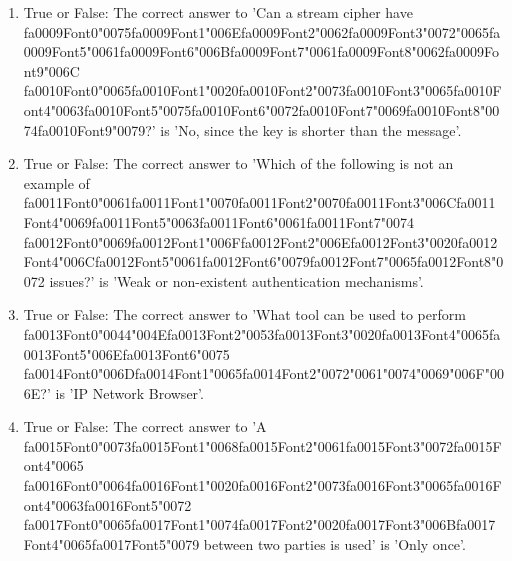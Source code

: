 \documentclass[12pt]{article}
\begin{document}
\begin{enumerate}[label=\arabic*.]
\item True or False: The correct answer to 'Can a stream cipher have {\csname fa0009Font0\endcsname\char"0075}{\csname fa0009Font1\endcsname\char"006E}{\csname fa0009Font2\endcsname\char"0062}{\csname fa0009Font3\endcsname\char"0072}{\char"0065}{\csname fa0009Font5\endcsname\char"0061}{\csname fa0009Font6\endcsname\char"006B}{\csname fa0009Font7\endcsname\char"0061}{\csname fa0009Font8\endcsname\char"0062}{\csname fa0009Font9\endcsname\char"006C} {\csname fa0010Font0\endcsname\char"0065}{\csname fa0010Font1\endcsname\char"0020}{\csname fa0010Font2\endcsname\char"0073}{\csname fa0010Font3\endcsname\char"0065}{\csname fa0010Font4\endcsname\char"0063}{\csname fa0010Font5\endcsname\char"0075}{\csname fa0010Font6\endcsname\char"0072}{\csname fa0010Font7\endcsname\char"0069}{\csname fa0010Font8\endcsname\char"0074}{\csname fa0010Font9\endcsname\char"0079}?' is 'No, since the key is shorter than the message'.
\item True or False: The correct answer to 'Which of the following is not an example of {\csname fa0011Font0\endcsname\char"0061}{\csname fa0011Font1\endcsname\char"0070}{\csname fa0011Font2\endcsname\char"0070}{\csname fa0011Font3\endcsname\char"006C}{\csname fa0011Font4\endcsname\char"0069}{\csname fa0011Font5\endcsname\char"0063}{\csname fa0011Font6\endcsname\char"0061}{\csname fa0011Font7\endcsname\char"0074} {\csname fa0012Font0\endcsname\char"0069}{\csname fa0012Font1\endcsname\char"006F}{\csname fa0012Font2\endcsname\char"006E}{\csname fa0012Font3\endcsname\char"0020}{\csname fa0012Font4\endcsname\char"006C}{\csname fa0012Font5\endcsname\char"0061}{\csname fa0012Font6\endcsname\char"0079}{\csname fa0012Font7\endcsname\char"0065}{\csname fa0012Font8\endcsname\char"0072} issues?' is 'Weak or non-existent authentication mechanisms'.
\item True or False: The correct answer to 'What tool can be used to perform {\csname fa0013Font0\endcsname\char"0044}{\char"004E}{\csname fa0013Font2\endcsname\char"0053}{\csname fa0013Font3\endcsname\char"0020}{\csname fa0013Font4\endcsname\char"0065}{\csname fa0013Font5\endcsname\char"006E}{\csname fa0013Font6\endcsname\char"0075} {\csname fa0014Font0\endcsname\char"006D}{\csname fa0014Font1\endcsname\char"0065}{\csname fa0014Font2\endcsname\char"0072}{\char"0061}{\char"0074}{\char"0069}{\char"006F}{\char"006E}?' is 'IP Network Browser'.
\item True or False: The correct answer to 'A {\csname fa0015Font0\endcsname\char"0073}{\csname fa0015Font1\endcsname\char"0068}{\csname fa0015Font2\endcsname\char"0061}{\csname fa0015Font3\endcsname\char"0072}{\csname fa0015Font4\endcsname\char"0065} {\csname fa0016Font0\endcsname\char"0064}{\csname fa0016Font1\endcsname\char"0020}{\csname fa0016Font2\endcsname\char"0073}{\csname fa0016Font3\endcsname\char"0065}{\csname fa0016Font4\endcsname\char"0063}{\csname fa0016Font5\endcsname\char"0072} {\csname fa0017Font0\endcsname\char"0065}{\csname fa0017Font1\endcsname\char"0074}{\csname fa0017Font2\endcsname\char"0020}{\csname fa0017Font3\endcsname\char"006B}{\csname fa0017Font4\endcsname\char"0065}{\csname fa0017Font5\endcsname\char"0079} between two parties is used' is 'Only once'.

\end{enumerate}
\end{document}
